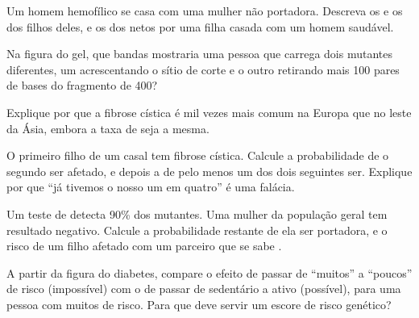 \begin{exercise}[$\star\star$]\label{exo:g11:genes-and-disease:9}
Um homem hemofílico se casa com uma mulher não portadora. Descreva os
 e os  dos filhos deles, e os dos netos por uma filha
casada com um homem saudável.
\end{exercise}

\begin{exercise}[$\star\star$]\label{exo:g11:genes-and-disease:10}
Na figura do gel, que bandas mostraria uma pessoa que carrega dois
 mutantes diferentes, um acrescentando o sítio de corte e o outro
retirando mais 100 pares de bases do fragmento de 400?
\end{exercise}

\begin{exercise}[$\star\star$]\label{exo:g11:genes-and-disease:11}
Explique por que a fibrose cística é mil vezes mais comum na Europa que
no leste da Ásia, embora a taxa de  seja a mesma.
\end{exercise}

\begin{exercise}[$\star\star\star$]\label{exo:g11:genes-and-disease:12}
O primeiro filho de um casal tem fibrose cística. Calcule a
probabilidade de o segundo ser afetado, e depois a de pelo menos um dos
dois seguintes ser. Explique por que ``já tivemos o nosso um em quatro''
é uma falácia.
\end{exercise}

\begin{exercise}[$\star\star\star$]\label{exo:g11:genes-and-disease:13}
Um teste de  detecta 90\% dos  mutantes. Uma mulher da
população geral tem resultado negativo. Calcule a probabilidade
restante de ela ser portadora, e o risco de um filho afetado com um
parceiro que se sabe .
\end{exercise}

\begin{exercise}[$\star\star\star$]\label{exo:g11:genes-and-disease:14}
A partir da figura do diabetes, compare o efeito de passar de
``muitos'' a ``poucos''  de risco (impossível) com o de passar de
sedentário a ativo (possível), para uma pessoa com muitos  de
risco. Para que deve servir um escore de risco genético?
\end{exercise}

